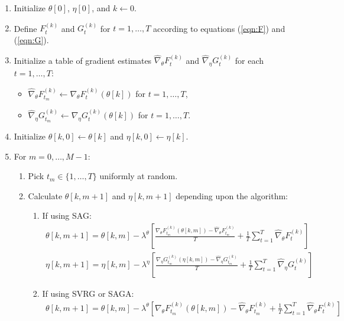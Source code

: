 \begin{enumerate}
    \item Initialize $\theta[0]$, $\eta[0]$, and $k \leftarrow 0$.
    \item Define $F_t^{(k)}$ and $G_t^{(k)}$ for $t = 1, \ldots, T$ according to equations (\ref{eqn:F}) and (\ref{eqn:G}).
    \item Initialize a table of gradient estimates $\widehat \nabla_\theta F_t^{(k)}$ and $\widehat \nabla_\eta G_t^{(k)}$ for each $t = 1,\ldots,T$:
    \begin{itemize}
        \item $\widehat \nabla_\theta F_{t_m}^{(k)} \leftarrow \nabla_\theta F_{t}^{(k)}(\theta[k])$ for $t = 1,\ldots,T$,
        \item $\widehat \nabla_\eta G_{t_m}^{(k)} \leftarrow \nabla_\eta G_{t}^{(k)}(\theta[k])$ for $t = 1,\ldots,T$.
    \end{itemize}
    \item Initialize $\theta[k,0] \leftarrow \theta[k]$ and $\eta[k,0] \leftarrow \eta[k]$.
    \item For $m = 0,\ldots,M-1$:
    \begin{enumerate}
        \item Pick $t_m \in \{1,\ldots,T\}$ uniformly at random.
        \item Calculate $\theta[k,m+1]$ and $\eta[k,m+1]$ depending upon the algorithm:
        \begin{enumerate}
            \item If using SAG:
            \begin{gather}
                \theta[k,m+1] = \theta[k,m] - \lambda^{\theta} \left[\frac{\nabla_\theta F_{t_m}^{(k)}(\theta[k,m]) - \widehat \nabla_\theta F_{t_m}^{(k)}}{T} + \frac{1}{T} \sum_{t=1}^T \widehat \nabla_\theta F^{(k)}_{t} \right] \\
                \eta[k,m+1] = \eta[k,m] - \lambda^{\eta} \left[\frac{\nabla_\eta G_{t_m}^{(k)}(\eta[k,m]) - \widehat \nabla_\eta G_{t_m}^{(k)}}{T} + \frac{1}{T} \sum_{t=1}^T \widehat \nabla_\eta G^{(k)}_{t} \right]
            \end{gather}
            \item If using SVRG or SAGA:
            \begin{gather}
                \theta[k,m+1] = \theta[k,m] - \lambda^{\theta} \left[\nabla_\theta F_{t_m}^{(k)}(\theta[k,m]) - \widehat \nabla_\theta F_{t_m}^{(k)} + \frac{1}{T} \sum_{t=1}^T \widehat \nabla_\theta F^{(k)}_{t} \right] \\

\end{gather}
\end{enumerate}
\end{enumerate}
\end{enumerate}
